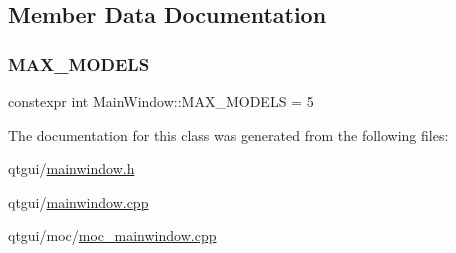 \subsection{Member Data Documentation}
\mbox{\label{class_main_window_a9d723d93888cfb94b48988f7d20e384e}} 
\subsubsection{\texorpdfstring{MAX\_MODELS}{MAX\_MODELS}}
{\footnotesize\ttfamily constexpr int Main\+Window\+::\+M\+A\+X\+\_\+\+M\+O\+D\+E\+LS = 5\hspace{0.3cm}{\ttfamily [static]}}



The documentation for this class was generated from the following files\+:\begin{DoxyCompactItemize}
\item 
qtgui/\mbox{\hyperlink{qtgui_2mainwindow_8h}{mainwindow.\+h}}\item 
qtgui/\mbox{\hyperlink{qtgui_2mainwindow_8cpp}{mainwindow.\+cpp}}\item 
qtgui/moc/\mbox{\hyperlink{qtgui_2moc_2moc__mainwindow_8cpp}{moc\+\_\+mainwindow.\+cpp}}\end{DoxyCompactItemize}
